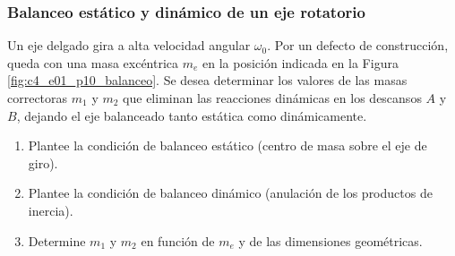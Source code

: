 \subsubsection{Balanceo estático y dinámico de un eje rotatorio}

Un eje delgado gira a alta velocidad angular $\omega_0$. Por un defecto de construcción,
queda con una masa excéntrica $m_e$ en la posición indicada en la Figura
\ref{fig:c4_e01_p10_balanceo}. Se desea determinar los valores de las masas correctoras
$m_1$ y $m_2$ que eliminan las reacciones dinámicas en los descansos $A$ y $B$, dejando el
eje balanceado tanto estática como dinámicamente.

\begin{enumerate}
    \item Plantee la condición de balanceo estático (centro de masa sobre el eje de giro).
    \item Plantee la condición de balanceo dinámico (anulación de los productos de inercia).
    \item Determine $m_1$ y $m_2$ en función de $m_e$ y de las dimensiones geométricas.
\end{enumerate}

